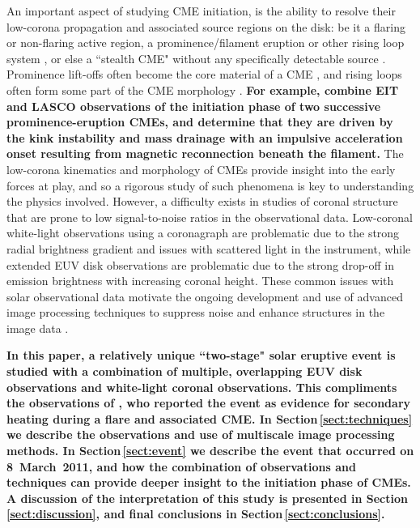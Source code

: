 \documentclass[namedreferences]{solarphysics}
\begin{document}
\begin{article}
An important aspect of studying CME initiation, is the ability to resolve their low-corona propagation and associated source regions on the disk: be it a flaring or non-flaring active region, a prominence/filament eruption or other rising loop system \cite{2002ApJ...566L.117Z,2001ApJ...561..372S}, or else a ``stealth CME" without any specifically detectable source \cite{2013SoPh..285..269H}. Prominence lift-offs often become the core material of a CME \cite{2008AnGeo..26.3025F,2003ApJ...586..562G}, and rising loops often form some part of the CME morphology \cite{2006A&A...455..339D,2004A&A...422..307C}. {\bf For example,  combine EIT and LASCO observations of the initiation phase of two successive prominence-eruption CMEs, and determine that they are driven by the kink instability and mass drainage with an impulsive acceleration onset resulting from magnetic reconnection beneath the filament.} The low-corona kinematics and morphology of CMEs provide insight into the early forces at play, and so a rigorous study of such phenomena is key to understanding the physics involved. However, a difficulty exists in studies of coronal structure that are prone to low signal-to-noise ratios in the observational data. Low-coronal white-light observations using a coronagraph are problematic due to the strong radial brightness gradient and issues with scattered light in the instrument, while extended EUV disk observations are problematic due to the strong drop-off in emission brightness with increasing coronal height. These common issues with solar observational data motivate the ongoing development and use of advanced image processing techniques to suppress noise and enhance structures in the image data \cite{2011ApJ...737...88D,2011AdSpR..47.2118G,2011igi-global,2008ApJ...674.1201S,2008SoPh..248..457Y,2006SoPh..236..263M,2003A&A...398.1185S}. 

{\bf In this paper, a relatively unique ``two-stage" solar eruptive event is studied with a combination of multiple, overlapping EUV disk observations and white-light coronal observations. This compliments the observations of , who reported the event as evidence for secondary heating during a flare and associated CME. In Section\,\ref{sect:techniques} we describe the observations and use of multiscale image processing methods. In Section\,\ref{sect:event} we describe the event that occurred on 8~March~2011, and how the combination of observations and techniques can provide deeper insight to the initiation phase of CMEs. A discussion of the interpretation of this study is presented in Section\,\ref{sect:discussion}, and final conclusions in Section\,\ref{sect:conclusions}.}


\end{article}
\end{document}
